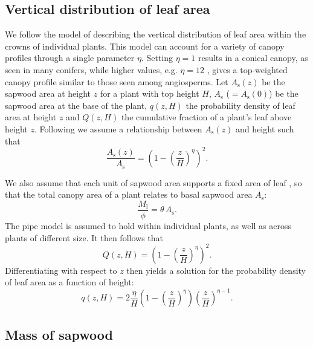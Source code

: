 \documentclass[10pt,twoside]{article}
\begin{document}
\subsection{Vertical distribution of leaf
area}\label{vertical-distribution-of-leaf-area}

We follow the model of \citet{Yokozawa-1995} describing the vertical
distribution of leaf area within the crowns of individual plants. This
model can account for a variety of canopy profiles through a single
parameter \(\eta\). Setting \(\eta = 1\) results in a conical canopy, as
seen in many conifers, while higher values, e.g. \(\eta = 12\) , gives a
top-weighted canopy profile similar to those seen among angiosperms. Let
\(A_\textrm{s}(z)\) be the sapwood area at height \(z\) for a plant with
top height \(H\), \(A_\textrm{s}\) ($= A_\textrm{s}(0)$) be the sapwood
area at the base of the plant, \(q(z, H)\) the probability density of
leaf area at height \(z\) and \(Q(z, H)\) the cumulative fraction of a
plant's leaf above height \(z\). Following \citet{Yokozawa-1995} we
assume a relationship between \(A_\textrm{s}(z)\) and height such that
\begin{equation}\label{eq:crown1}
\frac{A_\textrm{s}(z)}{A_\textrm{s}} = \left(1 - \left(\frac{z}{H}\right)^\eta\right)^2.
\end{equation}

We also assume that each unit of sapwood area supports a fixed area of
leaf \citep[the pipe model][]{Shinozaki-1964}, so that the total canopy
area of a plant relates to basal sapwood area \(A_\textrm{s}\):
\begin{equation}\label{eq:crown2}
\frac{M_\textrm{l}}{\phi} = \theta \, A_\textrm{s}.
\end{equation}
The pipe model is assumed to hold within individual plants, as well as
across plants of different size. It then follows that
\begin{equation}\label{eq:crown1}
Q(z, H) = \left(1-\left(\frac{z}{H}\right)^\eta\right)^2.
\end{equation}
Differentiating with respect to \(z\) then yields a solution for the
probability density of leaf area as a function of height:
\begin{equation}\label{eq:crown3}
q(z, H) = 2\frac{\eta}{H}\left(1-\left(\frac{z}{H}\right)^{\eta}\right) \left(\frac{z}{H}\right)^{\eta-1}.
\end{equation}

\subsection{Mass of sapwood}\label{mass-of-sapwood}
\end{document}

